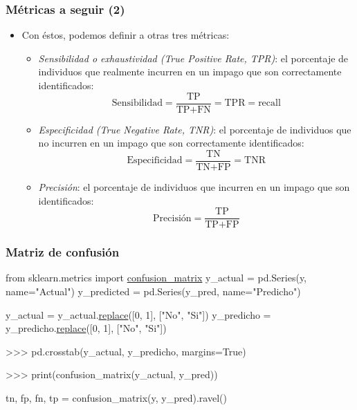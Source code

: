 \documentclass[usenames,dvipsnames]{beamer} %
\newcommand\defi[1]{\textcolor{NavyBlue}{\textit{#1}}}
\begin{document}
\begin{frame}\frametitle{M\'etricas a seguir (2)}
\begin{itemize}
	\item Con \'estos, podemos definir a otras tres m\'etricas:
	\begin{itemize}
		\item \defi{Sensibilidad o exhaustividad (True Positive Rate, TPR)}: el porcentaje de individuos que realmente incurren en un impago que son correctamente identificados:
		\[ \text{Sensibilidad} = \frac{\text{TP}}{\text{TP}+ \text{FN}} = \text{TPR}=\text{recall}\]
		\item \defi{Especificidad (True Negative Rate, TNR)}: el porcentaje de individuos que no incurren en un impago que son correctamente identificados:
		\[ \text{Especificidad} = \frac{\text{TN}}{\text{TN}+ \text{FP}} = \text{TNR}\]
		\item \defi{Precisi\'on}: el porcentaje de individuos que incurren en un impago que son identificados:
		\[ \text{Precisi\'on} = \frac{\text{TP}}{\text{TP}+ \text{FP}}\]
		
	\end{itemize}

\end{itemize}
\end{frame}



\begin{frame}[fragile]\frametitle{Matriz de confusi\'on}
\begin{semiverbatim}
	\textcolor{deepblue}{from} sklearn.metrics \textcolor{deepblue}{import} \href{https://scikit-learn.org/stable/modules/generated/sklearn.metrics.confusion_matrix.html}{confusion\_matrix}
y\_actual = pd.Series(y, name="Actual")
y\_predicted = pd.Series(y\_pred, name="Predicho")

y\_actual = y\_actual.\href{https://pandas.pydata.org/pandas-docs/stable/reference/api/pandas.DataFrame.replace.html}{replace}([0, 1], ["No", "Si"])
y\_predicho = y\_predicho.\href{https://pandas.pydata.org/pandas-docs/stable/reference/api/pandas.DataFrame.replace.html}{replace}([0, 1], ["No", "Si"])

>>> pd.crosstab(y\_actual, y\_predicho, margins=True)

>>> print(confusion\_matrix(y\_actual, y\_pred))

tn, fp, fn, tp = confusion\_matrix(y, y\_pred).ravel()

\end{semiverbatim}
\end{frame}
\end{document}
